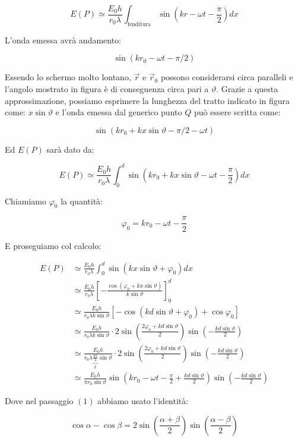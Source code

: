 \[
	E(P) \simeq \frac{E_0h}{r_0 \lambda} \int_{\text{fenditura}} \sin \left( kr-\omega t - \frac{\pi}{2} \right) dx
\]

L'onda emessa avrà andamento:

\[
	\sin (kr_0-\omega t -\pi /2 )
\]

Essendo lo schermo molto lontano, $\vec{r}$ e $\vec{r}_0$ possono considerarsi circa paralleli e l'angolo mostrato in figura è di conseguenza circa pari a $\vartheta$. Grazie a questa approssimazione, possiamo esprimere la lunghezza del tratto indicato in figura come: $x\sin \vartheta$ e l'onda emessa dal generico punto $Q$ può essere scritta come:

\[
	\sin (kr_0+kx\sin \vartheta -\pi /2 - \omega t)
\]

Ed $E(P)$ sarà dato da:

\[
	E(P) \simeq \frac{E_0h}{r_0 \lambda} \int_0^d  \sin \left( kr_0 +kx\sin \vartheta  -\omega t - \frac{\pi}{2} \right) dx
\]

Chiamiamo $\varphi_0 $ la quantità:

\[
	\varphi_0 = kr_0  -\omega t - \frac{\pi}{2}
\]

E proseguiamo col calcolo:

\begin{align*}
	E(P) &\simeq \frac{E_0h}{r_0 \lambda} \int_0^d  \sin (kx\sin \vartheta  +\varphi_0) dx \\
	&\simeq \frac{E_0h}{r_0 \lambda} \left[ -\frac{\cos (\varphi_0+kx\sin \vartheta)}{k\sin \vartheta} \right]_0^d \\
	&\simeq \frac{E_0h}{r_0\lambda k\sin \vartheta} [-\cos (kd\sin \vartheta +\varphi_0 ) + \cos \varphi_0 ] \tag*{(1)}\\
	&\simeq \frac{E_0h}{r_0\lambda k \sin \vartheta} \cdot 2 \sin \left( \frac{2\varphi_0+kd\sin \vartheta}{2} \right)  \sin \left( -\frac{kd\sin \vartheta}{2} \right)\\
	&\simeq \frac{E_0h}{r_0\lambda \underbrace{\frac{2\pi}{\lambda}}_k \sin \vartheta} \cdot 2 \sin \left( \frac{2\varphi_0+kd\sin \vartheta}{2} \right)  \sin \left( -\frac{kd\sin \vartheta}{2} \right)\\
	&\simeq \frac{E_0h}{\pi r_0\sin \vartheta}\sin \left( kr_0-\omega t - \frac{\pi}{2} + \frac{kd\sin \vartheta}{2}  \right) \sin \left( -\frac{kd\sin \vartheta}{2} \right)
\end{align*}

Dove nel passaggio $(1)$ abbiamo usato l'identità:

\[
	\cos \alpha -\cos \beta =2\sin \left( \frac{\alpha +\beta}{2} \right) \sin \left( \frac{\alpha -\beta}{2} \right)
\]

